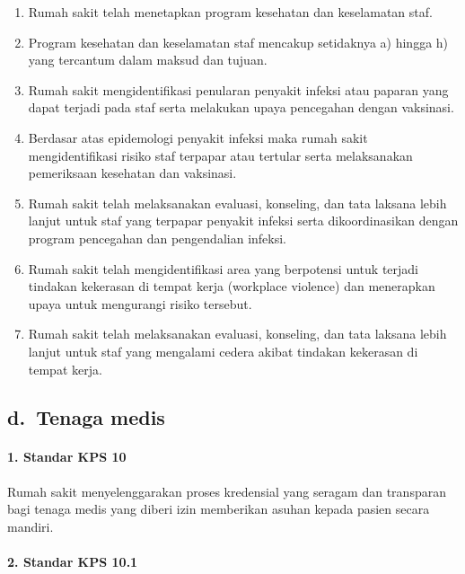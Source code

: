 \documentclass[
]{book}
\providecommand{\tightlist}{%
  \setlength{\itemsep}{0pt}\setlength{\parskip}{0pt}}
\begin{document}
\begin{enumerate}
\def\labelenumi{\alph{enumi}.}
\tightlist
\item
  Rumah sakit telah menetapkan program kesehatan dan keselamatan staf.
\item
  Program kesehatan dan keselamatan staf mencakup setidaknya a) hingga h) yang tercantum dalam maksud dan tujuan.
\item
  Rumah sakit mengidentifikasi penularan penyakit infeksi atau paparan yang dapat terjadi pada staf serta melakukan upaya pencegahan dengan vaksinasi.
\item
  Berdasar atas epidemologi penyakit infeksi maka rumah sakit mengidentifikasi risiko staf terpapar atau tertular serta melaksanakan pemeriksaan kesehatan dan vaksinasi.
\item
  Rumah sakit telah melaksanakan evaluasi, konseling, dan tata laksana lebih lanjut untuk staf yang terpapar penyakit infeksi serta dikoordinasikan dengan program pencegahan dan pengendalian infeksi.
\item
  Rumah sakit telah mengidentifikasi area yang berpotensi untuk terjadi tindakan kekerasan di tempat kerja (workplace violence) dan menerapkan upaya untuk mengurangi risiko tersebut.
\item
  Rumah sakit telah melaksanakan evaluasi, konseling, dan tata laksana lebih lanjut untuk staf yang mengalami cedera akibat tindakan kekerasan di tempat kerja.
\end{enumerate}

\hypertarget{d.-tenaga-medis}{%
\subsection*{d.~Tenaga medis}\label{d.-tenaga-medis}}

\hypertarget{standar-kps-10}{%
\paragraph*{1. Standar KPS 10}\label{standar-kps-10}}

Rumah sakit menyelenggarakan proses kredensial yang seragam dan transparan bagi tenaga medis yang diberi izin memberikan asuhan kepada pasien secara mandiri.

\hypertarget{standar-kps-10.1}{%
\paragraph*{2. Standar KPS 10.1}\label{standar-kps-10.1}}
\end{document}

